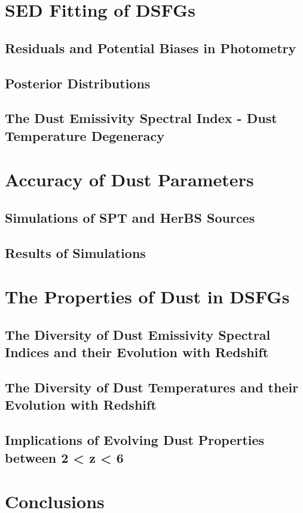 \section{SED Fitting of DSFGs}
\subsection{Residuals and Potential Biases in Photometry}
\subsection{Posterior Distributions}
\subsection{The Dust Emissivity Spectral Index - Dust Temperature Degeneracy}
\section{Accuracy of Dust Parameters}
\subsection{Simulations of SPT and HerBS Sources}
\subsection{Results of Simulations}
\section{The Properties of Dust in DSFGs}
\subsection{The Diversity of Dust Emissivity Spectral Indices and their Evolution with Redshift}
\subsection{The Diversity of Dust Temperatures and their Evolution with Redshift}
\subsection{Implications of Evolving Dust Properties between 2 < z < 6}
\section{Conclusions}

\listoftodos